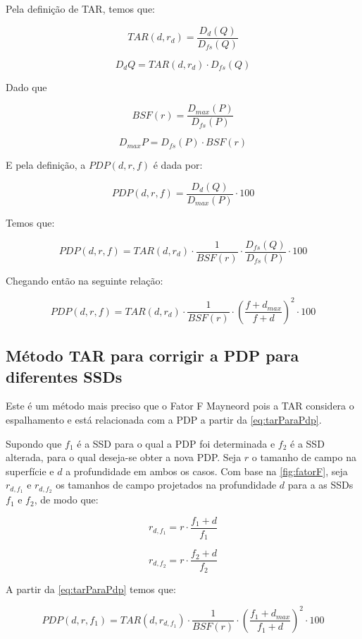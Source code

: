\documentclass[11pt,a4paper]{article}
\begin{document}
	Pela definição de TAR, temos que:

		$$TAR(d, r_d) = \frac{D_d(Q)}{D_{fs}(Q)}$$

	\begin{equation}
		D_d{Q} = TAR(d, r_d) \cdot D_{fs}(Q)
	\end{equation}

	Dado que 

		$$BSF(r) = \frac{D_{max}(P)}{D_{fs}(P)}$$

		$$D_{max}{P} = D_{fs}(P) \cdot BSF(r)$$

	E pela definição, a $PDP(d, r, f)$ é dada por:

		$$PDP(d, r, f) = \frac{D_d(Q)}{D_{max}(P)} \cdot 100$$

	Temos que:

		$$PDP(d, r, f) = TAR(d, r_d) \cdot \frac{1}{BSF(r)} \cdot \frac{D_{fs}(Q)}{D_{fs}(P)} \cdot 100$$

	Chegando então na seguinte relação:

	\begin{equation}
		PDP(d, r, f) = TAR(d, r_d) \cdot \frac{1}{BSF(r)} \cdot \left(\frac{f + d_{max}}{f + d}\right)^2 \cdot 100
		\label{eq:tarParaPdp}
	\end{equation}

	\subsection{Método TAR para corrigir a PDP para diferentes SSDs}

	Este é um método mais preciso que o Fator F Mayneord pois a TAR considera o espalhamento e está relacionada com a PDP a partir da \ref{eq:tarParaPdp}.

	Supondo que $f_1$ é a SSD para o qual a PDP foi determinada e $f_2$ é a SSD alterada, para o qual deseja-se obter a nova PDP. Seja $r$ o tamanho de campo na superfície e $d$ a profundidade em ambos os casos. Com base na \ref{fig:fatorF}, seja $r_{d, f_1}$ e $r_{d, f_2}$ os tamanhos de campo projetados na profundidade $d$ para a as SSDs $f_1$ e $f_2$, de modo que:

		$$r_{d, f_1} = r \cdot \frac{f_1 + d}{f_1}$$

		$$r_{d, f_2} = r \cdot \frac{f_2 + d}{f_2}$$

	A partir da \ref{eq:tarParaPdp} temos que:

		$$PDP(d, r, f_1) = TAR(d, r_{d, f_1}) \cdot \frac{1}{BSF(r)} \cdot \left(\frac{f_1 + d_{max}}{f_1 + d}\right)^2 \cdot 100$$
\end{document}
